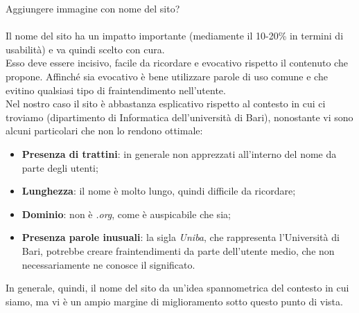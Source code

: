 Aggiungere immagine con nome del sito?\\
\\ 
Il nome del sito ha un impatto importante (mediamente il 10-20\% in termini di usabilità) e va quindi scelto con cura.\\
Esso deve essere incisivo, facile da ricordare e evocativo rispetto il contenuto che propone. Affinché sia evocativo è bene utilizzare parole di uso comune e che evitino qualsiasi tipo di fraintendimento nell'utente.\\
Nel nostro caso il sito è abbastanza esplicativo rispetto al contesto in cui ci troviamo (dipartimento di Informatica dell'università di Bari), nonostante vi sono alcuni particolari che non lo rendono ottimale:
	\begin{itemize}
		\item \textbf{Presenza di trattini}: in generale non apprezzati all'interno del nome da parte degli utenti;
		\item \textbf{Lunghezza}: il nome è molto lungo, quindi difficile da ricordare;
		\item \textbf{Dominio}: non è \textit{.org}, come è auspicabile che sia;
		\item \textbf{Presenza parole inusuali}: la sigla \textit{Uniba}, che rappresenta l'Università di Bari, potrebbe creare fraintendimenti 												 da parte dell'utente medio, che non necessariamente ne conosce il significato.
	\end{itemize}
In generale, quindi, il nome del sito da un'idea spannometrica del contesto in cui siamo, ma vi è un ampio margine di miglioramento sotto questo punto di vista.